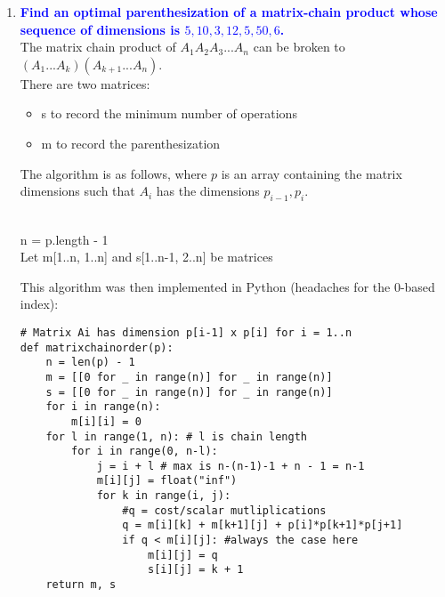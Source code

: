 \documentclass[11pt]{article}
\begin{document}
\begin{enumerate}
    
\item \textbf{\textcolor{blue}{Find an optimal parenthesization of a matrix-chain product whose sequence of dimensions is $5,10,3,12,5,50,6$.}}
    \\ The matrix chain product of $A_1A_2A_3...A_n$ can be broken to $(A_1...A_k)(A_{k+1}...A_n)$.
    \\ There are two matrices:
    \begin{itemize}
        \item s to record the minimum number of operations
        \item m to record the parenthesization
    \end{itemize}
    The algorithm is as follows, where $p$ is an array containing the matrix dimensions such that $A_i$ has the dimensions $p_{i-1}, p_i$.
    \\
    \begin{algorithm}[H]
        \Indm{}\\
        \Indp
            n = p.length - 1 \\
            Let m[1..n, 1..n] and s[1..n-1, 2..n] be matrices \\
    \end{algorithm}
    This algorithm was then implemented in Python (headaches for the 0-based index): \\
    \begin{verbatim}
# Matrix Ai has dimension p[i-1] x p[i] for i = 1..n
def matrixchainorder(p):
    n = len(p) - 1
    m = [[0 for _ in range(n)] for _ in range(n)]
    s = [[0 for _ in range(n)] for _ in range(n)]
    for i in range(n):
        m[i][i] = 0
    for l in range(1, n): # l is chain length
        for i in range(0, n-l):
            j = i + l # max is n-(n-1)-1 + n - 1 = n-1 
            m[i][j] = float("inf")
            for k in range(i, j):
                #q = cost/scalar mutliplications
                q = m[i][k] + m[k+1][j] + p[i]*p[k+1]*p[j+1]
                if q < m[i][j]: #always the case here
                    m[i][j] = q
                    s[i][j] = k + 1
    return m, s


\end{verbatim}
\end{enumerate}
\end{document}
